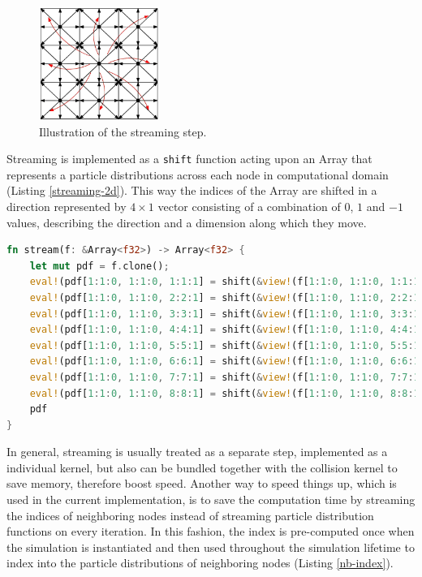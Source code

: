 \begin{figure}[!ht]
\centering
\includegraphics[width=0.35\textwidth]{figures/streaming.jpg}
\caption{Illustration of the streaming step.}
\label{fig:streaming}
\end{figure}

Streaming is implemented as a \texttt{shift} function acting upon an Array that represents a particle distributions across each node in computational domain (Listing \ref{streaming-2d}). This way the indices of the Array are shifted in a direction represented by $4 \times 1$ vector consisting of a combination of $0$, $1$ and $-1$ values, describing the direction and a dimension along which they move.

\begin{lstlisting}[language=Rust, caption=Streaming with \texttt{shift} function for two dimensions with 9 discrete speeds (D2Q9)., label=streaming-2d]
fn stream(f: &Array<f32>) -> Array<f32> {
	let mut pdf = f.clone();
	eval!(pdf[1:1:0, 1:1:0, 1:1:1] = shift(&view!(f[1:1:0, 1:1:0, 1:1:1]), &[1, 0, 0, 0]));
	eval!(pdf[1:1:0, 1:1:0, 2:2:1] = shift(&view!(f[1:1:0, 1:1:0, 2:2:1]), &[0, 1, 0, 0]));
	eval!(pdf[1:1:0, 1:1:0, 3:3:1] = shift(&view!(f[1:1:0, 1:1:0, 3:3:1]), &[-1, 0, 0, 0]));
	eval!(pdf[1:1:0, 1:1:0, 4:4:1] = shift(&view!(f[1:1:0, 1:1:0, 4:4:1]), &[0, -1, 0, 0]));
	eval!(pdf[1:1:0, 1:1:0, 5:5:1] = shift(&view!(f[1:1:0, 1:1:0, 5:5:1]), &[1, 1, 0, 0]));
	eval!(pdf[1:1:0, 1:1:0, 6:6:1] = shift(&view!(f[1:1:0, 1:1:0, 6:6:1]), &[-1, 1, 0, 0]));
	eval!(pdf[1:1:0, 1:1:0, 7:7:1] = shift(&view!(f[1:1:0, 1:1:0, 7:7:1]), &[-1, -1, 0, 0]));
	eval!(pdf[1:1:0, 1:1:0, 8:8:1] = shift(&view!(f[1:1:0, 1:1:0, 8:8:1]), &[1, -1, 0, 0]));
	pdf
}
\end{lstlisting}

In general, streaming is usually treated as a separate step, implemented as a individual kernel, but also can be bundled together with the collision kernel to save memory, therefore boost speed. Another way to speed things up, which is used in the current implementation, is to save the computation time by streaming the indices of neighboring nodes instead of streaming particle distribution functions on every iteration. In this fashion, the index is pre-computed once when the simulation is instantiated and then used throughout the simulation lifetime to index into the particle distributions of neighboring nodes (Listing \ref{nb-index}).

